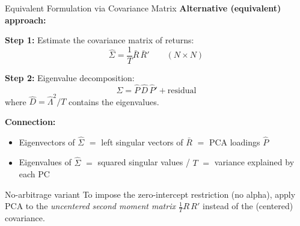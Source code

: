 \documentclass[aspectratio=169]{beamer}
\begin{document}
%
%
\begin{frame}{Equivalent Formulation via Covariance Matrix}
\small
\textbf{Alternative (equivalent) approach:}

\vspace{0.3em}
\textbf{Step 1:} Estimate the covariance matrix of returns:
\[
\hat{\Sigma} = \frac{1}{T}\bar{R}\,\bar{R}'  \qquad (N \times N)
\]

\textbf{Step 2:} Eigenvalue decomposition:
\[
\hat{\Sigma} = \hat{P}\,\hat{D}\,\hat{P}' + \text{residual}
\]
where $\hat{D} = \hat{\Lambda}^2 / T$ contains the eigenvalues.

\vspace{0.7em}
\textbf{Connection:}
\begin{itemize}
    \item Eigenvectors of $\hat{\Sigma}$ $=$ left singular vectors of $\bar{R}$ $=$ PCA loadings $\hat{P}$
    \item Eigenvalues of $\hat{\Sigma}$ $=$ squared singular values / $T$ $=$ variance explained by each PC
\end{itemize}

\vspace{0.5em}
\begin{exampleblock}{No-arbitrage variant}
To impose the zero-intercept restriction (no alpha), apply PCA to the \emph{uncentered second moment matrix} $\frac{1}{T}R\,R'$ instead of the (centered) covariance.
\end{exampleblock}
\end{frame}
%
%
\end{document}
